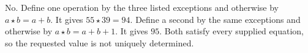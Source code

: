 No. Define one operation by the three listed exceptions and otherwise by $a\star b=a+b$. It gives $55\star39=94$. Define a second by the same exceptions and otherwise by $a\star b=a+b+1$. It gives $95$. Both satisfy every supplied equation, so the requested value is not uniquely determined.
